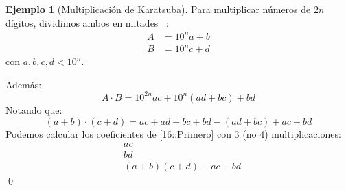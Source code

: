 \documentclass[english, spanish, fleqn, 10pt]{article}
\numberwithin{equation}{section}
\newcommand{\nparentesis}[1]{\left( #1 \right)}
\theoremstyle{definition}
\newtheorem{beforeExample}{Ejemplo}[section]
\newenvironment{ejemplo}[1][]{\begin{beforeExample}[#1]\renewcommand{\qedsymbol}{$\blacksquare$}}{\qed\end{beforeExample}}
\begin{document}
\begin{ejemplo}[Multiplicación de Karatsuba]
  Para multiplicar números de $2n$ dígitos,
  dividimos ambos en mitades~%
    \cite{karatsuba62:_multiplication}:
	\begin{align*}
	A&=10^na+b\\
	B&=10^nc+d
	\end{align*}
	con $a, b, c, d < 10^n$.
	
	Además:
	\begin{equation}\label{16::Primero}
	A\cdot B = 10^{2n}ac + 10^n\nparentesis{ad+bc} + bd
	\end{equation}
	Notando que:
	\begin{equation*}
	\nparentesis{a+b}\cdot \nparentesis{c+d} = ac + ad + bc + bd - \nparentesis{ad + bc} + ac + bd
	\end{equation*}
	Podemos calcular los coeficientes de \eqref{16::Primero} con 3 (no 4) multiplicaciones:
	\begin{align*}
	  &a c \\
          &b d \\
          &(a + b) (c + d) - a c - b d
	\end{align*}
\end{ejemplo}
\end{document}
